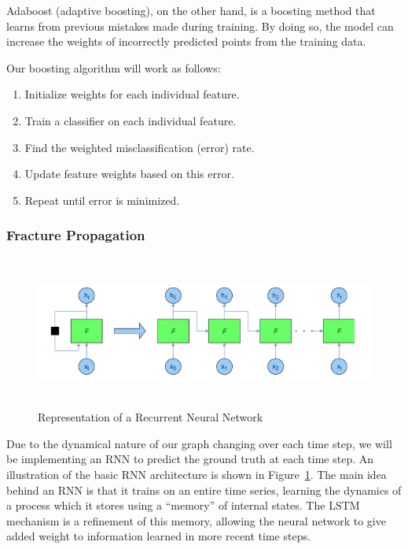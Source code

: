 Adaboost (adaptive boosting), on the other hand, is a boosting method that learns from previous mistakes made during training. By doing so, the model can increase the weights of incorrectly predicted points from the training data.

Our boosting algorithm will work as follows:

\begin{enumerate}
    \item Initialize weights for each individual feature.
    \item Train a classifier on each individual feature.
    \item Find the weighted misclassification (error) rate.
    \item Update feature weights based on this error.
    \item Repeat until error is minimized.
\end{enumerate}


\subsubsection{Fracture Propagation}

\begin{figure}[!b]
    \centering
    \noindent
\includegraphics[width=12cm , height = 5cm]{images/rnn.PNG}
    \caption{Representation of a Recurrent Neural Network}
    \label{fig:rnn}
\end{figure}

Due to the dynamical nature of our graph changing over each time step, we will be implementing an RNN to predict the ground truth at each time step. An illustration of the basic RNN architecture is shown in Figure~\ref{fig:rnn}.  The main idea behind an RNN is that it trains on an entire time series, learning the dynamics of a process which it stores using a ``memory'' of internal states.  The LSTM mechanism is a refinement of this memory, allowing the neural network to give added weight to information learned in more recent time steps.

